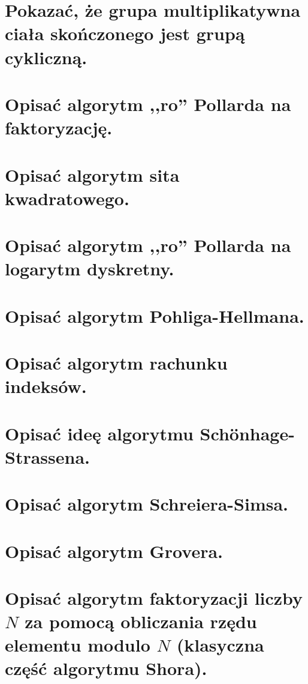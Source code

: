 \section{Pokazać, że grupa multiplikatywna ciała skończonego jest grupą cykliczną.}


\section{Opisać algorytm ,,ro'' Pollarda na faktoryzację.}
\label{C:rho_factorization}


\section{Opisać algorytm sita kwadratowego.}


\section{Opisać algorytm ,,ro'' Pollarda na logarytm dyskretny.}



\section{Opisać algorytm Pohliga-Hellmana.}


\newpage
\section{Opisać algorytm rachunku indeksów.}


\section{Opisać ideę algorytmu Sch{\"o}nhage-Strassena.}


\section{Opisać algorytm Schreiera-Simsa.}


\newpage
\section{Opisać algorytm Grovera.}


\section{Opisać algorytm faktoryzacji liczby \( N \) za pomocą obliczania rzędu elementu modulo \( N \) (klasyczna część algorytmu Shora).}


%